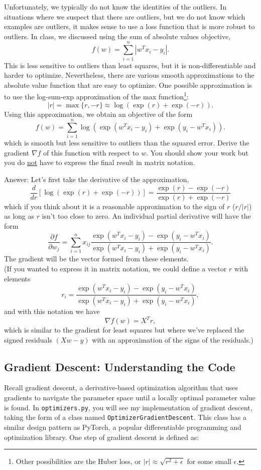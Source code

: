 \documentclass{article}
\def\ans#1{\par\gre{Answer: #1}}
\def\answer#1{\ans{#1}}
\def\blu#1{{\color{blu}#1}}
\def\gre#1{{\color{gre}#1}}
\begin{document}
Unfortunately, we typically do not know the identities of the outliers. In situations where we suspect that there are outliers, but we do not know which examples are outliers, it makes sense to use a loss function that is more robust to outliers. In class, we discussed using the sum of absolute values objective,
\[
f(w) = \sum_{i=1}^n |w^Tx_i - y_i|.
\]
This is less sensitive to outliers than least squares, but it is non-differentiable and harder to optimize. Nevertheless, there are various smooth approximations to the absolute value function that are easy to optimize. One possible approximation is to use the log-sum-exp approximation of the max function\footnote{Other possibilities are the Huber loss, or $|r|\approx \sqrt{r^2+\epsilon}$ for some small $\epsilon$.}:
\[
|r| = \max\{r, -r\} \approx \log(\exp(r) + \exp(-r)).
\]
Using this approximation, we obtain an objective of the form
\[
f(w) {=} \sum_{i=1}^n  \log\left(\exp(w^Tx_i - y_i) + \exp(y_i - w^Tx_i)\right).
\]
which is smooth but less sensitive to outliers than the squared error. \blu{Derive
 the gradient $\nabla f$ of this function with respect to $w$. You should show your work but you do \underline{not} have to express the final result in matrix notation.}

\answer{
Let's first take the derivative of the approximation,
\[
\frac{d}{dr} [\log(\exp(r) + \exp(-r))] = \frac{\exp(r)-\exp(-r)}{\exp(r)+\exp(-r)}
\]
which if you think about it is a reasonable approximation to the sign of $r$ ($r/|r|$) as long as $r$ isn't too close to zero.
An individual partial derivative will have the form
\[
\frac{\partial f}{\partial w_j} = \sum_{i=1}^n x_{ij}\frac{\exp(w^Tx_i  - y_i) - \exp(y_i - w^Tx_i)}{\exp(w^Tx_i  - y_i) + \exp(y_i - w^Tx_i)}.
\]
The gradient will be the vector formed from these elements.\\
(If you wanted to express it in matrix notation, we could define a vector $r$ with elements
\[
r_i = \frac{\exp(w^Tx_i  - y_i) - \exp(y_i - w^Tx_i)}{\exp(w^Tx_i  - y_i) + \exp(y_i - w^Tx_i)},
\]
and with this notation we have
\[
\nabla f(w) = X^Tr,
\]
which is similar to the gradient for least squares but where we've replaced the signed residuals $(Xw - y)$ with an approximation of the signs of the residuals.)
}

\subsection{Gradient Descent: Understanding the Code}

Recall gradient descent, a derivative-based optimization algorithm that uses gradients to navigate the parameter space until a locally optimal parameter value is found. In \texttt{optimizers.py}, you will see my implementation of gradient descent, taking the form of a class named \texttt{OptimizerGradientDescent}. This class has a similar design pattern as PyTorch, a popular differentiable programming and optimization library. One step of gradient descent is defined as:
\end{document}
